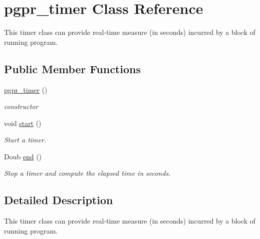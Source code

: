 \hypertarget{classpgpr__timer}{\section{pgpr\-\_\-timer Class Reference}
\label{classpgpr__timer}
}


This timer class can provide real-\/time measure (in seconds) incurred by a block of running program.  


\subsection*{Public Member Functions}
\begin{DoxyCompactItemize}
\item 
\hypertarget{classpgpr__timer_a71561182800d5c213e9c5003c9b2e893}{\hyperlink{classpgpr__timer_a71561182800d5c213e9c5003c9b2e893}{pgpr\-\_\-timer} ()}\label{classpgpr__timer_a71561182800d5c213e9c5003c9b2e893}

\begin{DoxyCompactList}\small\item\em constructor \end{DoxyCompactList}\item 
\hypertarget{classpgpr__timer_ae30d8bfbf046764791f934d198f122b3}{void \hyperlink{classpgpr__timer_ae30d8bfbf046764791f934d198f122b3}{start} ()}\label{classpgpr__timer_ae30d8bfbf046764791f934d198f122b3}

\begin{DoxyCompactList}\small\item\em Start a timer. \end{DoxyCompactList}\item 
Doub \hyperlink{classpgpr__timer_ac81e09244717a72ce57242e86aa6c200}{end} ()
\begin{DoxyCompactList}\small\item\em Stop a timer and compute the elapsed time in seconds. \end{DoxyCompactList}\end{DoxyCompactItemize}


\subsection{Detailed Description}
This timer class can provide real-\/time measure (in seconds) incurred by a block of running program. 


